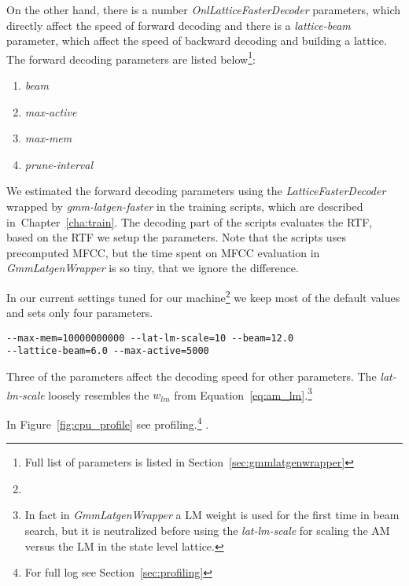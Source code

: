On the other hand, there is a number {\it OnlLatticeFasterDecoder}\/ parameters,
which directly affect the speed of forward decoding and there is a {\it lattice-beam}\/ parameter,
which affect the speed of backward decoding and building a lattice.
The forward decoding parameters are listed below\footnote{Full list of parameters is listed in Section~\ref{sec:gmmlatgenwrapper}}:
\begin{enumerate}
    \item {\it beam} 
    \item {\it max-active} 
    \item {\it max-mem} 
    \item {\it prune-interval} 
\end{enumerate}

We estimated the forward decoding parameters using the {\it LatticeFasterDecoder}\/
wrapped by {\it gmm-latgen-faster}\/ in the training scripts,
which are described in~Chapter~\ref{cha:train}. The decoding part of the scripts evaluates 
the \ac{RTF}, based on the \ac{RTF} we setup the parameters. 
Note that the scripts uses precomputed \ac{MFCC}, but the time spent on \ac{MFCC} evaluation
in {\it GmmLatgenWrapper}\/ is so tiny, that we ignore the difference.

In our current settings tuned for our machine\footnote{}
we keep most of the default values and sets only four parameters.
\begin{verbatim}
--max-mem=10000000000 --lat-lm-scale=10 --beam=12.0 
--lattice-beam=6.0 --max-active=5000
\end{verbatim}
Three of the parameters affect the decoding speed  for other parameters.
The {\it lat-lm-scale}\/ loosely resembles the $w_{lm}$ from 
Equation~\ref{eq:am_lm}.\footnote{In fact in {\it GmmLatgenWrapper}\/ 
    a \ac{LM} weight is used for the first time in beam search,
    but it is neutralized before using the {\it lat-lm-scale}\/ for scaling 
the \ac{AM} versus the \ac{LM} in the state level lattice.}

In Figure~\ref{fig:cpu_profile} see profiling.\footnote{For full log see Section~\ref{sec:profiling}}
.

